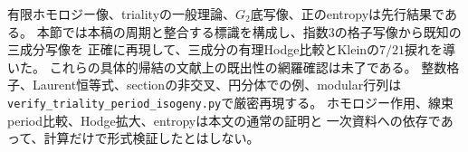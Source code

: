\begin{remark}[検証と新規性の位置付け]
有限ホモロジー像、trialityの一般理論、$G_2$底写像、正のentropyは先行結果である。
本節では本稿の周期と整合する標識を構成し、指数3の格子写像から既知の三成分写像を
正確に再現して、三成分の有理Hodge比較とKleinの$7/21$捩れを導いた。
これらの具体的帰結の文献上の既出性の網羅確認は未了である。
整数格子、Laurent恒等式、sectionの非交叉、円分体での例、modular行列は
\texttt{verify\_triality\_period\_isogeny.py}で厳密再現する。
ホモロジー作用、線束period比較、Hodge拡大、entropyは本文の通常の証明と
一次資料への依存であって、計算だけで形式検証したとはしない。
\end{remark}
